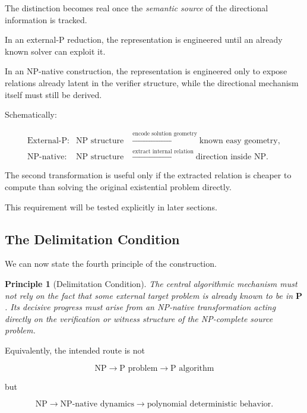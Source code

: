 \documentclass[11pt]{article}
\theoremstyle{plain}
\newtheorem{principle}[theorem]{Principle}
\theoremstyle{definition}
\begin{document}
The distinction becomes real once the \emph{semantic source} of the
directional information is tracked.

In an external-P reduction, the representation is engineered until an
already known solver can exploit it.

In an NP-native construction, the representation is engineered only to expose
relations already latent in the verifier structure, while the directional
mechanism itself must still be derived.

Schematically:

\[
\begin{array}{rcl}
\text{External-P:}
&
\text{NP structure}
&\xrightarrow{\text{encode solution geometry}}
\text{known easy geometry},
\\[6pt]
\text{NP-native:}
&
\text{NP structure}
&\xrightarrow{\text{extract internal relation}}
\text{direction inside NP}.
\end{array}
\]

The second transformation is useful only if the extracted relation is cheaper
to compute than solving the original existential problem directly.

This requirement will be tested explicitly in later sections.

\subsection{The Delimitation Condition}

We can now state the fourth principle of the construction.

\begin{principle}[Delimitation Condition]
\label{principle:delimitation}
The central algorithmic mechanism must not rely on the fact that some external
target problem is already known to be in \(\mathbf{P}\).  Its decisive
progress must arise from an NP-native transformation acting directly on the
verification or witness structure of the NP-complete source problem.
\end{principle}

Equivalently, the intended route is not

\[
    \boxed{
    \text{NP}
    \rightarrow
    \text{P problem}
    \rightarrow
    \text{P algorithm}
    }
\]

but

\[
    \boxed{
    \text{NP}
    \rightarrow
    \text{NP-native dynamics}
    \rightarrow
    \text{polynomial deterministic behavior}.
    }
\]
\end{document}
